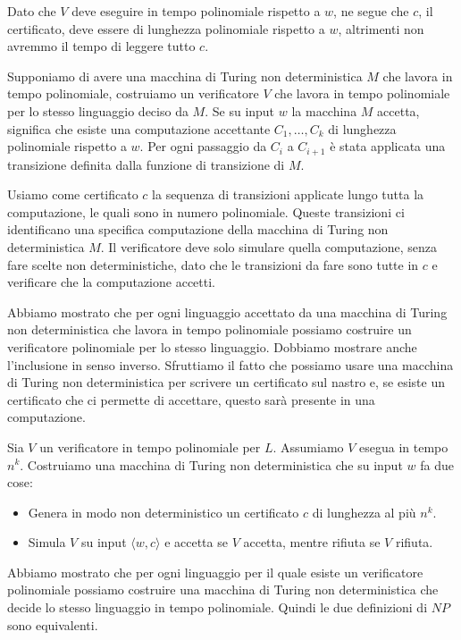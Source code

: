 Dato che $V$ deve eseguire in tempo polinomiale rispetto a $w$, ne segue che $c$, 
il certificato, deve essere di lunghezza polinomiale rispetto a $w$, altrimenti 
non avremmo il tempo di leggere tutto $c$.

Supponiamo di avere una macchina di Turing non deterministica $M$ che lavora in 
tempo polinomiale, costruiamo un verificatore $V$ che lavora in tempo polinomiale 
per lo stesso linguaggio deciso da $M$. Se su input $w$ la macchina $M$ accetta, 
significa che esiste una computazione accettante $C_1, \dots, C_k$ di lunghezza 
polinomiale rispetto a $w$. Per ogni passaggio da $C_i$ a $C_{i + 1}$ è stata applicata 
una transizione definita dalla funzione di transizione di $M$.

Usiamo come certificato $c$ la sequenza di transizioni applicate lungo tutta la 
computazione, le quali sono in numero polinomiale. Queste transizioni ci identificano
 una specifica computazione della macchina di Turing non deterministica $M$.
  Il verificatore deve solo simulare quella computazione, senza fare scelte non 
  deterministiche, dato che le transizioni da fare sono tutte in $c$ e verificare 
  che la computazione accetti.

Abbiamo mostrato che per ogni linguaggio accettato da una macchina di Turing non 
deterministica che lavora in tempo polinomiale possiamo costruire un verificatore 
polinomiale per lo stesso linguaggio. Dobbiamo mostrare anche l'inclusione in senso
 inverso. Sfruttiamo il fatto che possiamo usare una macchina di Turing non 
 deterministica per scrivere un certificato sul nastro e, se esiste un certificato 
 che ci permette di accettare, questo sarà presente in una computazione.

Sia $V$ un verificatore in tempo polinomiale per $L$. Assumiamo $V$ esegua in 
tempo $n^k$. Costruiamo una macchina di Turing non deterministica che su input $w$ fa due cose:
\begin{itemize}
    \item Genera in modo non deterministico un certificato $c$ di lunghezza al più $n^k$.
    \item Simula $V$ su input $\langle w, c \rangle$ e accetta se $V$ accetta, 
    mentre rifiuta se $V$ rifiuta.
\end{itemize}

Abbiamo mostrato che per ogni linguaggio per il quale esiste un verificatore 
polinomiale possiamo costruire una
macchina di Turing non deterministica che decide lo stesso linguaggio in tempo 
polinomiale. Quindi le due definizioni di $NP$ sono equivalenti.

